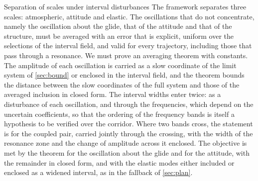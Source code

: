 \documentclass[english,11pt]{extarticle}
\begin{document}
\begin{openitem}{Separation of scales under interval disturbances}
\label{obj:averaging}
The framework separates three scales: atmospheric, attitude and elastic. The
oscillations that do not concentrate, namely the oscillation about the
glide, that of the attitude and that of the structure, must be averaged with
an error that is explicit, uniform over the selections of the interval
field, and valid for every trajectory, including those that pass through a
resonance. We must prove an averaging theorem with constants. The amplitude
of each oscillation is carried as a slow coordinate of the limit system of
\cref{sec:bound} or enclosed in the interval field, and the theorem bounds
the distance between the slow coordinates of the full system and those of
the averaged inclusion in closed form. The interval widths enter twice: as a
disturbance of each oscillation, and through the frequencies, which depend
on the uncertain coefficients, so that the ordering of the frequency bands
is itself a hypothesis to be verified over the corridor. Where two bands
cross, the statement is for the coupled pair, carried jointly through the
crossing, with the width of the resonance zone and the change of amplitude
across it enclosed. The objective is met by the theorem for the oscillation
about the glide and for the attitude, with the remainder in closed form, and
with the elastic modes either included or enclosed as a widened interval, as
in the fallback of \cref{sec:plan}.
\end{openitem}
\end{document}

